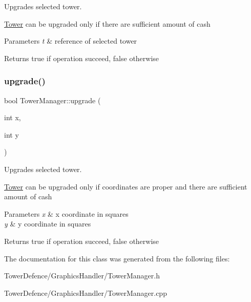 Upgrades selected tower. 

\mbox{\hyperlink{class_tower}{Tower}} can be upgraded only if there are sufficient amount of cash 
\begin{DoxyParams}{Parameters}
{\em t} & reference of selected tower \\
\hline
\end{DoxyParams}
\begin{DoxyReturn}{Returns}
true if operation succeed, false otherwise 
\end{DoxyReturn}
\mbox{\label{class_tower_manager_a08071e4d7230bd316577086f787fffeb}} 
\subsubsection{\texorpdfstring{upgrade()}{upgrade()}\hspace{0.1cm}{\footnotesize\ttfamily [2/2]}}
{\footnotesize\ttfamily bool Tower\+Manager\+::upgrade (\begin{DoxyParamCaption}\item[{int}]{x,  }\item[{int}]{y }\end{DoxyParamCaption})}



Upgrades selected tower. 

\mbox{\hyperlink{class_tower}{Tower}} can be upgraded only if coordinates are proper and there are sufficient amount of cash 
\begin{DoxyParams}{Parameters}
{\em x} & x coordinate in squares \\
\hline
{\em y} & y coordinate in squares \\
\hline
\end{DoxyParams}
\begin{DoxyReturn}{Returns}
true if operation succeed, false otherwise 
\end{DoxyReturn}


The documentation for this class was generated from the following files\+:\begin{DoxyCompactItemize}
\item 
Tower\+Defence/\+Graphics\+Handler/Tower\+Manager.\+h\item 
Tower\+Defence/\+Graphics\+Handler/Tower\+Manager.\+cpp\end{DoxyCompactItemize}
